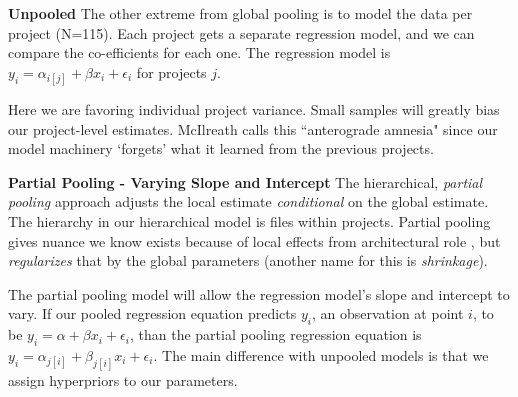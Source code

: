 \documentclass[sigconf,natbib=false]{acmart}
\begin{document}

\noindent\textbf{Unpooled}
The other extreme from global pooling is to model the data per project (N=115).
Each project gets a separate regression model, and we can compare the
co-efficients for each one. The regression model is $y_i = \alpha_{i[j]} + \beta
x_i + \epsilon_i $ for projects $j$.


Here we are favoring individual project variance. Small samples will greatly
bias our project-level estimates. McIlreath \cite{mcilreath16} calls this
``anterograde amnesia" since our model machinery `forgets' what it learned from
the previous projects. 

\noindent\textbf{Partial Pooling - Varying Slope and Intercept}
The hierarchical, \emph{partial pooling} approach adjusts the local estimate
\emph{conditional} on the global estimate. The hierarchy in our hierarchical
model is files within projects.  Partial pooling gives nuance we know exists
because of local effects from architectural role \cite{Aniche2016}, but
\emph{regularizes} that by the global parameters (another name for this is
\emph{shrinkage}).   

The partial pooling model will allow the regression model's slope and intercept
to vary. If our pooled regression equation predicts $y_i$, an observation at
point $i$, to be  $y_i = \alpha + \beta x_i + \epsilon_i$, than the partial
pooling regression equation is $y_i = \alpha_{j[i]} + \beta_{j[i]} x_{i} +
\epsilon_i$. The main difference with unpooled models is that we assign
hyperpriors to our parameters. 
\end{document}
